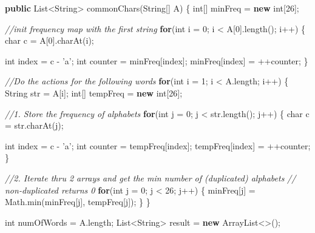 \documentclass[]{book}
\newenvironment{Shaded}{\begin{snugshade}}{\end{snugshade}}
\newcommand{\BuiltInTok}[1]{#1}
\newcommand{\CharTok}[1]{\textcolor[rgb]{0.31,0.60,0.02}{#1}}
\newcommand{\CommentTok}[1]{\textcolor[rgb]{0.56,0.35,0.01}{\textit{#1}}}
\newcommand{\DataTypeTok}[1]{\textcolor[rgb]{0.13,0.29,0.53}{#1}}
\newcommand{\DecValTok}[1]{\textcolor[rgb]{0.00,0.00,0.81}{#1}}
\newcommand{\FunctionTok}[1]{\textcolor[rgb]{0.00,0.00,0.00}{#1}}
\newcommand{\KeywordTok}[1]{\textcolor[rgb]{0.13,0.29,0.53}{\textbf{#1}}}
\newcommand{\NormalTok}[1]{#1}
\begin{document}
\begin{Shaded}
\begin{Highlighting}[]
\KeywordTok{public} \BuiltInTok{List}\NormalTok{<}\BuiltInTok{String}\NormalTok{> }\FunctionTok{commonChars}\NormalTok{(}\BuiltInTok{String}\NormalTok{[] A) \{}
    \DataTypeTok{int}\NormalTok{[] minFreq = }\KeywordTok{new} \DataTypeTok{int}\NormalTok{[}\DecValTok{26}\NormalTok{];}

    \CommentTok{//init frequency map with the first string}
    \KeywordTok{for}\NormalTok{(}\DataTypeTok{int}\NormalTok{ i = }\DecValTok{0}\NormalTok{; i < A[}\DecValTok{0}\NormalTok{].}\FunctionTok{length}\NormalTok{(); i++) \{}
        \DataTypeTok{char}\NormalTok{ c = A[}\DecValTok{0}\NormalTok{].}\FunctionTok{charAt}\NormalTok{(i);}

        \DataTypeTok{int}\NormalTok{ index = c - }\CharTok{'a'}\NormalTok{;}
        \DataTypeTok{int}\NormalTok{ counter = minFreq[index];}
\NormalTok{        minFreq[index] = ++counter;}
\NormalTok{    \}}


    \CommentTok{//Do the actions for the following words}
    \KeywordTok{for}\NormalTok{(}\DataTypeTok{int}\NormalTok{ i = }\DecValTok{1}\NormalTok{; i < A.}\FunctionTok{length}\NormalTok{; i++) \{}
        \BuiltInTok{String}\NormalTok{ str = A[i];}
        \DataTypeTok{int}\NormalTok{[] tempFreq = }\KeywordTok{new} \DataTypeTok{int}\NormalTok{[}\DecValTok{26}\NormalTok{];}

        \CommentTok{//1. Store the frequency of alphabets}
        \KeywordTok{for}\NormalTok{(}\DataTypeTok{int}\NormalTok{ j = }\DecValTok{0}\NormalTok{; j < str.}\FunctionTok{length}\NormalTok{(); j++) \{}
            \DataTypeTok{char}\NormalTok{ c = str.}\FunctionTok{charAt}\NormalTok{(j);}

            \DataTypeTok{int}\NormalTok{ index = c - }\CharTok{'a'}\NormalTok{;}
            \DataTypeTok{int}\NormalTok{ counter = tempFreq[index];}
\NormalTok{            tempFreq[index] = ++counter;}
\NormalTok{        \}}

        \CommentTok{//2. Iterate thru 2 arrays and get the min number of (duplicated) alphabets}
        \CommentTok{//   non-duplicated returns 0}
        \KeywordTok{for}\NormalTok{(}\DataTypeTok{int}\NormalTok{ j = }\DecValTok{0}\NormalTok{; j < }\DecValTok{26}\NormalTok{; j++) \{}
\NormalTok{            minFreq[j] = }\BuiltInTok{Math}\NormalTok{.}\FunctionTok{min}\NormalTok{(minFreq[j], tempFreq[j]);}
\NormalTok{        \}}
\NormalTok{    \}}

    \DataTypeTok{int}\NormalTok{ numOfWords = A.}\FunctionTok{length}\NormalTok{;}
    \BuiltInTok{List}\NormalTok{<}\BuiltInTok{String}\NormalTok{> result = }\KeywordTok{new} \BuiltInTok{ArrayList}\NormalTok{<>();}



\end{Highlighting}
\end{Shaded}
\end{document}
